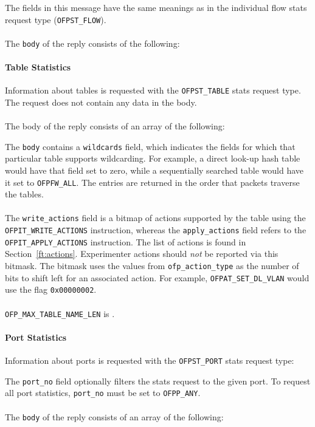 

The fields in this message have the same meanings as in the individual flow stats request type (\verb|OFPST_FLOW|).
\\\\
The \verb|body| of the reply consists of the following:

 

\paragraph{Table Statistics}
Information about tables is requested with the \verb|OFPST_TABLE| stats request type.  The request does not contain any data in the body.
\\\\
The body of the reply consists of an array of the following:


The \verb|body| contains a \verb|wildcards| field, which indicates the fields for which that particular table supports wildcarding. For example, a direct look-up hash table would have that field set to zero, while a sequentially searched table would have it set to \verb|OFPFW_ALL|. The entries are returned in the order that packets traverse the tables. 
\\\\
The \verb|write_actions| field is a bitmap of actions supported by the table using the \verb|OFPIT_WRITE_ACTIONS| instruction, whereas the \verb|apply_actions| field refers to the \verb|OFPIT_APPLY_ACTIONS| instruction.  The list of actions is found in Section~\ref{ft:actions}. Experimenter actions should \emph{not} be reported via this bitmask. The bitmask uses the values from \verb|ofp_action_type| as the number of bits to shift left for an associated action. For example, \verb|OFPAT_SET_DL_VLAN| would use the flag \verb|0x00000002|.
\\\\
\verb|OFP_MAX_TABLE_NAME_LEN| is .

\paragraph{Port Statistics}
Information about ports is requested with the \verb|OFPST_PORT| stats request type:


The \verb|port_no| field optionally filters the stats request to the given port.  To request all port statistics, \verb|port_no| must be set to \verb|OFPP_ANY|.
\\\\
The \verb|body| of the reply consists of an array of the following:

